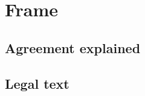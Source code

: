 %
%
%
\part{Frame}
\label{frame}
\chapter{Agreement explained}
\label{frame_explained}
\chapter{Legal text}
\label{frame_legal_text}


